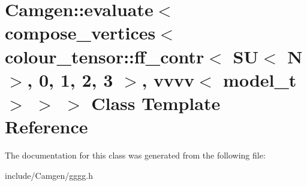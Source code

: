 \hypertarget{a00173}{}\section{Camgen\+:\+:evaluate$<$ compose\+\_\+vertices$<$ colour\+\_\+tensor\+:\+:ff\+\_\+contr$<$ S\+U$<$ N $>$, 0, 1, 2, 3 $>$, vvvv$<$ model\+\_\+t $>$ $>$ $>$ Class Template Reference}
\label{a00173}


The documentation for this class was generated from the following file\+:\begin{DoxyCompactItemize}
\item 
include/\+Camgen/gggg.\+h\end{DoxyCompactItemize}
